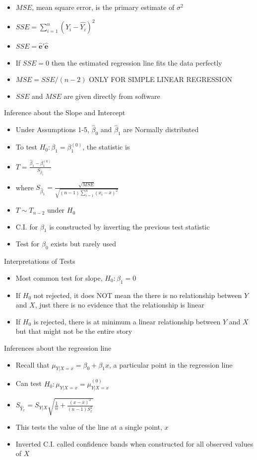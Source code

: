 \documentclass[handout,x11names,unknownkeysallowed]{beamer}
\makeatletter
\newcommand{\beamitem}{\begin{itemize}[<+-|alert@+>]}
\makeatother
\begin{document}
\begin{frame}
\beamitem
\item $MSE$, mean square error, is the primary estimate of $\sigma^2$
\item $SSE=\sum_{i=1}^n (Y_i-\hat{Y_i})^2$
\item $SSE = \bm{\hat{e}'\hat{e}}$
\item If $SSE =0$ then the estimated regression line fits the data perfectly
\item $MSE = SSE/(n-2)$ ONLY FOR SIMPLE LINEAR REGRESSION
\item $SSE$ and $MSE$ are given directly from software
\end{itemize}
\end{frame}

\begin{frame}
Inference about the Slope and Intercept
\beamitem
\item Under Assumptions 1-5, $\hat\beta_0$ and $\hat\beta_1$ are Normally distributed
\item To test $H_0: \beta_1 = \beta_1^{(0)}$, the statistic is 
\item $T = \frac{\hat\beta_1 - \beta_1^{(0)}}{S_{\hat\beta_1}}$ 
\item where $S_{\hat\beta_1} = \frac{\sqrt{MSE}}{\sqrt{(n-1)\sum_{i=1}^n (x_i-\bar{x})^2}}$
\item $T \sim T_{n-2}$ under $H_0$
\item C.I. for $\beta_1$ is constructed by inverting the previous test statistic
\item Test for $\beta_0$ exists but rarely used
\end{itemize}
\end{frame}

\begin{frame}
Interpretations of Tests
\beamitem
\item Most common test for slope, $H_0: \beta_1 = 0$
\item If $H_0$ not rejected, it does NOT mean the there is no relationship between $Y$ and $X$, just there is no evidence that the relationship is linear
\item If $H_0$ is rejected, there is at minimum a linear relationship between $Y$ and $X$ but that might not be the entire story

\end{itemize}
\end{frame}

\begin{frame}
Inferences about the regression line
\beamitem
\item Recall that $\mu_{Y|X=x} = \beta_0 + \beta_1 x$, a particular point in the regression line
\item Can test $H_0: \mu_{Y|X=x} = \mu_{Y|X=x}^{(0)}$
\item $S_{\hat{Y}_{x}} =S_{Y|X} \sqrt{\frac{1}{n}+ \frac{(x-\bar{x})^2}{(n-1)S^2_x}}$
\item This tests the value of the line at a single point, $x$
\item Inverted C.I. called confidence bands when constructed for all observed values of $X$
\end{itemize}
\end{frame}
\end{document}

